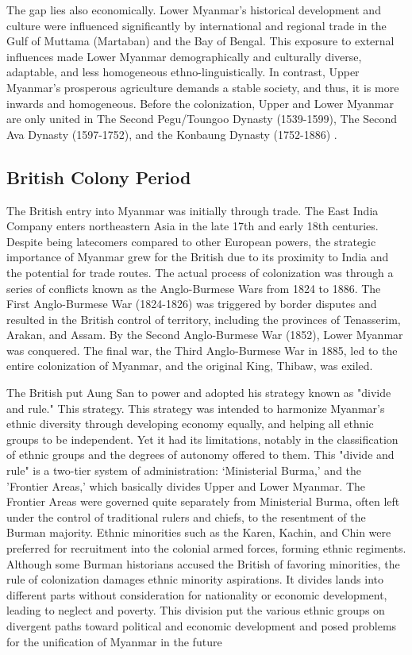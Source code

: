 \documentclass[man,floatsintext]{apa7}
\begin{document}
The gap lies also economically. Lower Myanmar's historical development and culture were influenced significantly by international and regional trade in the Gulf of Muttama (Martaban) and the Bay of Bengal. This exposure to external influences made Lower Myanmar demographically and culturally diverse, adaptable, and less homogeneous ethno-linguistically. In contrast, Upper Myanmar's prosperous agriculture demands a stable society, and thus, it is more inwards and homogeneous. Before the colonization, Upper and Lower Myanmar are only united in The Second Pegu/Toungoo Dynasty (1539-1599), The Second Ava Dynasty (1597-1752), and the Konbaung Dynasty (1752-1886) \autocite[33,44,130]{aung-thwinHistoryMyanmarAncient2012}.

\subsection{British Colony Period}

The British entry into Myanmar was initially through trade. The East India Company enters northeastern Asia in the late 17th and early 18th centuries. Despite being latecomers compared to other European powers, the strategic importance of Myanmar grew for the British due to its proximity to India and the potential for trade routes. The actual process of colonization was through a series of conflicts known as the Anglo-Burmese Wars from 1824 to 1886. The First Anglo-Burmese War (1824-1826) was triggered by border disputes and resulted in the British control of territory, including the provinces of Tenasserim, Arakan, and Assam. By the Second Anglo-Burmese War (1852), Lower Myanmar was conquered. The final war, the Third Anglo-Burmese War in 1885, led to the entire colonization of Myanmar, and the original King, Thibaw, was exiled. \autocite[174-194]{aung-thwinHistoryMyanmarAncient2012}

The British put Aung San to power and adopted his strategy known as "divide and rule." This strategy. This strategy was intended to harmonize Myanmar's ethnic diversity through developing economy equally, and helping all ethnic groups to be independent. Yet it had its limitations, notably in the classification of ethnic groups and the degrees of autonomy offered to them. This "divide and rule" is a two-tier system of administration: `Ministerial Burma,' and the 'Frontier Areas,' which basically divides Upper and Lower Myanmar. The Frontier Areas were governed quite separately from Ministerial Burma, often left under the control of traditional rulers and chiefs, to the resentment of the Burman majority. Ethnic minorities such as the Karen, Kachin, and Chin were preferred for recruitment into the colonial armed forces, forming ethnic regiments. Although some Burman historians accused the British of favoring minorities, the rule of colonization damages ethnic minority aspirations. It divides lands into different parts without consideration for nationality or economic development, leading to neglect and poverty. This division put the various ethnic groups on divergent paths toward political and economic development and posed problems for the unification of Myanmar in the future \autocite[18-23]{smithEthnicGroupsBurma1994}
\end{document}
